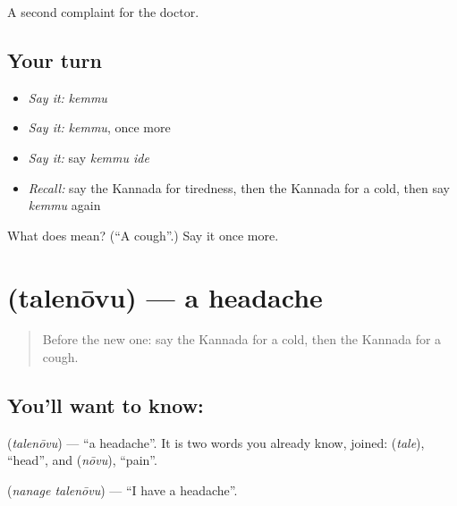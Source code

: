 \begin{grammarlens}[title={What you've built}]
A second complaint for the doctor.
\end{grammarlens}

\subsection*{Your turn}
\begin{itemize}
\raggedright
  \item \emph{Say it:} \emph{kemmu}
  \item \emph{Say it:} \emph{kemmu}, once more
  \item \emph{Say it:} say \emph{kemmu ide}
  \item \emph{Recall:} say the Kannada for tiredness, then the Kannada for a cold, then say \emph{kemmu} again
\end{itemize}

\begin{tcolorbox}[breakable,colback=teal!4,colframe=teal!35!black,title={Before you move on}]
What does  mean? (\textquotedblleft{}A cough\textquotedblright{}.) Say it once more.
\end{tcolorbox}
\section[\texorpdfstring{\kn{ತಲೆನೋವು} (talenōvu)}{ತಲೆನೋವು (talenōvu)}]{ (talenōvu) — a headache}

\label{lesson:KA-C82-headache}



\begin{quote}
Before the new one: say the Kannada for a cold, then the Kannada for a cough.
\end{quote}

\subsection*{You'll want to know: }
\textbf{} (\emph{talenōvu}) — \textquotedblleft{}a headache\textquotedblright{}. It is two words you already know, joined: \textbf{} (\emph{tale}), \textquotedblleft{}head\textquotedblright{}, and \textbf{} (\emph{nōvu}), \textquotedblleft{}pain\textquotedblright{}.

\textbf{ } (\emph{nanage talenōvu}) — \textquotedblleft{}I have a headache\textquotedblright{}.

